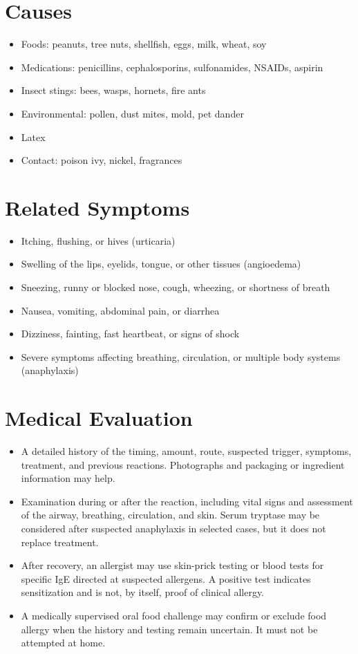 \section*{Causes}
\begin{itemize}
\item Foods: peanuts, tree nuts, shellfish, eggs, milk, wheat, soy
\item Medications: penicillins, cephalosporins, sulfonamides, NSAIDs, aspirin
\item Insect stings: bees, wasps, hornets, fire ants
\item Environmental: pollen, dust mites, mold, pet dander
\item Latex
\item Contact: poison ivy, nickel, fragrances
\end{itemize}

\section*{Related Symptoms}
\begin{itemize}
\item Itching, flushing, or hives (urticaria)
\item Swelling of the lips, eyelids, tongue, or other tissues (angioedema)
\item Sneezing, runny or blocked nose, cough, wheezing, or shortness of breath
\item Nausea, vomiting, abdominal pain, or diarrhea
\item Dizziness, fainting, fast heartbeat, or signs of shock
\item Severe symptoms affecting breathing, circulation, or multiple body systems (anaphylaxis)
\end{itemize}

\section*{Medical Evaluation}
\begin{itemize}
\item A detailed history of the timing, amount, route, suspected trigger, symptoms, treatment, and previous reactions. Photographs and packaging or ingredient information may help.
\item Examination during or after the reaction, including vital signs and assessment of the airway, breathing, circulation, and skin. Serum tryptase may be considered after suspected anaphylaxis in selected cases, but it does not replace treatment.
\item After recovery, an allergist may use skin-prick testing or blood tests for specific IgE directed at suspected allergens. A positive test indicates sensitization and is not, by itself, proof of clinical allergy.
\item A medically supervised oral food challenge may confirm or exclude food allergy when the history and testing remain uncertain. It must not be attempted at home.
\end{itemize}

